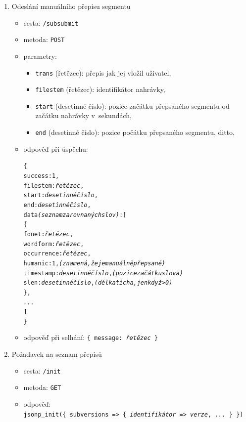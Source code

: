 \begin{enumerate}
\item{
    Odeslání manuálního přepisu segmentu
    \begin{itemize}
    \item{cesta: \texttt{/subsubmit}}
    \item{metoda: \texttt{POST}}
    \item{
        parametry:
        \begin{itemize}
            \item{\texttt{trans} (řetězec): přepis jak jej vložil uživatel,}
            \item{\texttt{filestem} (řetězec): identifikátor nahrávky,}
            \item{\texttt{start} (desetinné číslo): pozice začátku přepsaného segmentu od začátku nahrávky v~sekundách,}
            \item{\texttt{end} (desetinné číslo): pozice počátku přepsaného segmentu, ditto,}
        \end{itemize}
    }
    \item{
    odpověď při úspěchu: \begin{alltt}\{
  success: 1,
  filestem: {\em řetězec},
  start: {\em desetinné číslo},
  end: {\em desetinné číslo},
  data {\em (seznam zarovnaných slov)}: [ 
    \{
      fonet: {\em řetězec},
      wordform: {\em řetězec},
      occurrence: {\em řetězec},
      humanic: 1, {\em (znamená, že je manuálně přepsané)}
      timestamp: {\em desetinné číslo}, {\em (pozice začátku slova)}
      slen: {\em desetinné číslo}, {\em (délka ticha, jen když > 0)}
    \},
    {\em ...}
  ]
\}\end{alltt}
    }
    \item{odpověď při selhání: \texttt{\{ message: {\em řetězec} \}}}
    \end{itemize}
}
\item{
    Požadavek na seznam přepisů
    \begin{itemize}
      \item{cesta: \texttt{/init}}
      \item{metoda: \texttt{GET}}
      \item{
        odpověď:\\ \texttt{jsonp\_init(\{ subversions => \{ {\em identifikátor} => {\em verze}, {\em ...} \} \})}
      }
    \end{itemize}

}
\end{enumerate}
